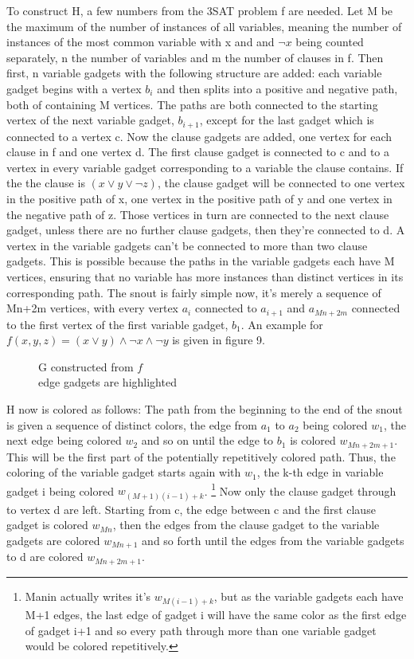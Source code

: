 \documentclass[12pt,a4paper]{article}
\begin{document}
To construct H, a few numbers from the 3SAT problem f are needed. Let M be the maximum of the  number of instances of all variables, meaning the number of instances of the most common variable with x and and $\neg x$ being counted separately, n the number of variables and m the number of clauses in f. Then first, n variable gadgets with the following structure are added: each variable gadget begins with a vertex $b_i$ and then splits into a positive and negative path, both of containing M vertices. The paths are both connected to the starting vertex of the next variable gadget, $b_{i+1}$, except for the last gadget which is connected to a vertex c. Now the clause gadgets are added, one vertex for each clause in f and one vertex d. The first clause gadget is connected to c and to a vertex in every variable gadget corresponding to a variable the clause contains. If the the clause is $(x \vee y \vee \neg z)$, the clause gadget will be connected to one vertex in the positive path of x, one vertex in the positive path of y and one vertex in the negative path of z. Those vertices in turn are connected to the next clause gadget, unless there are no further clause gadgets, then they're connected to d. A vertex in the variable gadgets can't be connected to more than two clause gadgets. This is possible because the paths in the variable gadgets each have M vertices, ensuring that no variable has more instances than distinct vertices in its corresponding path. The snout is fairly simple now, it's merely a sequence of Mn+2m vertices, with every vertex $a_i$ connected to $a_{i+1}$ and $a_{Mn+2m}$ connected to the first  vertex of the first variable gadget, $b_1$. An example for $f(x, y, z) = (x \vee y) \wedge \neg x \wedge \neg y$ is given in figure 9. 
\newline
\begin{wrapfigure}{l}{9cm}
	
	\caption{G constructed from $f$ \\edge gadgets are highlighted}
\end{wrapfigure}
\newline
H now is colored as follows: The path from the beginning to the end of the snout is given a sequence of distinct colors, the edge from $a_1$ to $a_2$ being colored $w_1$, the next edge being colored $w_2$ and so on until the edge to $b_1$ is colored $w_{Mn+2m+1}$. This will be the first part of the potentially repetitively colored path. Thus, the coloring of the variable gadget starts again with $w_1$, the k-th edge in variable gadget i being colored $w_{(M+1)(i-1)+k}$. \footnote{Manin actually writes it's $w_{M(i-1)+k}$, but as the variable gadgets each have M+1 edges, the last edge of gadget i will have the same color as the first edge of gadget i+1 and so every path through more than one variable gadget would be colored repetitively.} Now only the clause gadget through to vertex d are left. Starting from c, the edge between c and the first clause gadget is colored $w_{Mn}$, then the edges from the clause gadget to the variable gadgets are colored $w_{Mn+1}$ and so forth until the edges from the variable gadgets to d are colored $w_{Mn+2m+1}$. 
\end{document}
